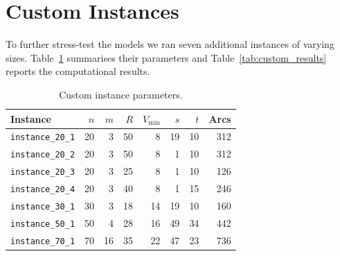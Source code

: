 \documentclass[12pt, a4paper]{article}
\begin{document}
\section{Custom Instances}

To further stress-test the models we ran seven additional instances of varying sizes.
Table~\ref{tab:custom_params} summarises their parameters and
Table~\ref{tab:custom_results} reports the computational results.

\begin{table}[H]
\centering
\caption{Custom instance parameters.}
\label{tab:custom_params}
\begin{tabular}{lrrrrrrr}
\toprule
Instance & $n$ & $m$ & $R$ & $V_{\min}$ & $s$ & $t$ & Arcs \\
\midrule
\texttt{instance\_20\_1} & 20 & 3 & 50 & 8  & 19 & 10 & 312 \\
\texttt{instance\_20\_2} & 20 & 3 & 50 & 8  &  1 & 10 & 312 \\
\texttt{instance\_20\_3} & 20 & 3 & 25 & 8  &  1 & 10 & 126 \\
\texttt{instance\_20\_4} & 20 & 3 & 40 & 8  &  1 & 15 & 246 \\
\texttt{instance\_30\_1} & 30 & 3 & 18 & 14 & 19 & 10 & 160 \\
\texttt{instance\_50\_1} & 50 & 4 & 28 & 16 & 49 & 34 & 442 \\
\texttt{instance\_70\_1} & 70 & 16 & 35 & 22 & 47 & 23 & 736 \\
\bottomrule
\end{tabular}
\end{table}
\end{document}
